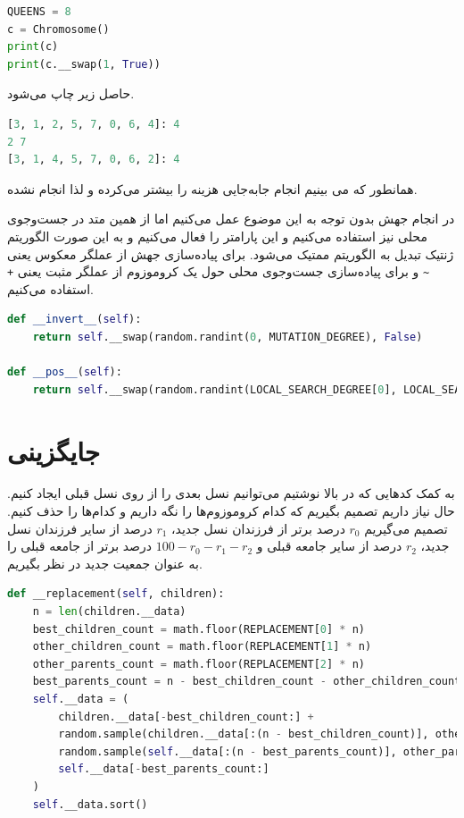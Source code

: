 \documentclass[a4paper, 12pt]{article}
\theoremstyle{definition}
\begin{document}
\LTR
\begin{lstlisting}[language=Python]
QUEENS = 8
c = Chromosome()
print(c)
print(c.__swap(1, True))
\end{lstlisting}
\RTL

حاصل زیر چاپ می‌شود.

\LTR
\begin{lstlisting}[language=Python]
[3, 1, 2, 5, 7, 0, 6, 4]: 4
2 7
[3, 1, 4, 5, 7, 0, 6, 2]: 4
\end{lstlisting}
\RTL

همانطور که می بینیم انجام جابه‌جایی هزینه را بیشتر می‌کرده و لذا انجام نشده.

در انجام جهش بدون توجه به این موضوع عمل می‌کنیم اما از همین متد در جست‌وجوی محلی نیز استفاده می‌کنیم و این پارامتر را فعال می‌کنیم و به این صورت الگوریتم ژنتیک تبدیل به الگوریتم ممتیک می‌شود. برای پیاده‌سازی جهش از عملگر معکوس یعنی
\texttt{\textasciitilde}
و برای پیاده‌سازی جست‌وجوی محلی حول یک کروموزوم از عملگر مثبت یعنی
\texttt{+}
استفاده می‌کنیم.

\LTR
\begin{lstlisting}[language=Python]
def __invert__(self):
    return self.__swap(random.randint(0, MUTATION_DEGREE), False)

def __pos__(self):
    return self.__swap(random.randint(LOCAL_SEARCH_DEGREE[0], LOCAL_SEARCH_DEGREE[1]), True)
\end{lstlisting}
\RTL

\section{جایگزینی}
به کمک کدهایی که در بالا نوشتیم می‌توانیم نسل بعدی را از روی نسل قبلی ایجاد کنیم. حال نیاز داریم تصمیم بگیریم که کدام کروموزوم‌ها را نگه داریم و کدام‌ها را حذف کنیم. تصمیم می‌گیریم
$r_0$
درصد برتر از فرزندان نسل جدید،
$r_1$
درصد از سایر فرزندان نسل جدید،
$r_2$
درصد از سایر جامعه قبلی و
$100 - r_0 - r_1 - r_2$
درصد برتر از جامعه قبلی را به عنوان جمعیت جدید در نظر بگیریم.

\LTR
\begin{lstlisting}[language=Python]
def __replacement(self, children):
    n = len(children.__data)
    best_children_count = math.floor(REPLACEMENT[0] * n)
    other_children_count = math.floor(REPLACEMENT[1] * n)
    other_parents_count = math.floor(REPLACEMENT[2] * n)
    best_parents_count = n - best_children_count - other_children_count - other_parents_count
    self.__data = (
        children.__data[-best_children_count:] +
        random.sample(children.__data[:(n - best_children_count)], other_children_count) +
        random.sample(self.__data[:(n - best_parents_count)], other_parents_count) +
        self.__data[-best_parents_count:]
    )
    self.__data.sort()
\end{lstlisting}
\RTL
\end{document}
